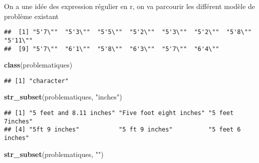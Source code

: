 \documentclass[
]{article}
\newenvironment{Shaded}{\begin{snugshade}}{\end{snugshade}}
\newcommand{\CommentTok}[1]{\textcolor[rgb]{0.56,0.35,0.01}{\textit{#1}}}
\newcommand{\FunctionTok}[1]{\textcolor[rgb]{0.13,0.29,0.53}{\textbf{#1}}}
\newcommand{\NormalTok}[1]{#1}
\newcommand{\OtherTok}[1]{\textcolor[rgb]{0.56,0.35,0.01}{#1}}
\newcommand{\SpecialCharTok}[1]{\textcolor[rgb]{0.81,0.36,0.00}{\textbf{#1}}}
\newcommand{\StringTok}[1]{\textcolor[rgb]{0.31,0.60,0.02}{#1}}
\begin{document}
On a une idée des expression régulier en r, on va parcourir les
différent modèle de problème existant

\begin{Shaded}
\end{Shaded}

\begin{verbatim}
##  [1] "5'7\""  "5'3\""  "5'5\""  "5'2\""  "5'3\""  "5'2\""  "5'8\""  "5'11\""
##  [9] "5'7\""  "6'1\""  "5'8\""  "6'3\""  "5'7\""  "6'4\""
\end{verbatim}

\begin{Shaded}
\begin{Highlighting}[]
\FunctionTok{class}\NormalTok{(problematiques)}
\end{Highlighting}
\end{Shaded}

\begin{verbatim}
## [1] "character"
\end{verbatim}

\begin{Shaded}
\begin{Highlighting}[]
\FunctionTok{str\_subset}\NormalTok{(problematiques, }\StringTok{"inches"}\NormalTok{)}
\end{Highlighting}
\end{Shaded}

\begin{verbatim}
## [1] "5 feet and 8.11 inches" "Five foot eight inches" "5 feet 7inches"        
## [4] "5ft 9 inches"           "5 ft 9 inches"          "5 feet 6 inches"
\end{verbatim}

\begin{Shaded}
\begin{Highlighting}[]
\FunctionTok{str\_subset}\NormalTok{(problematiques, }\StringTok{"\textquotesingle{}\textquotesingle{}"}\NormalTok{)}
\end{Highlighting}
\end{Shaded}
\end{document}
